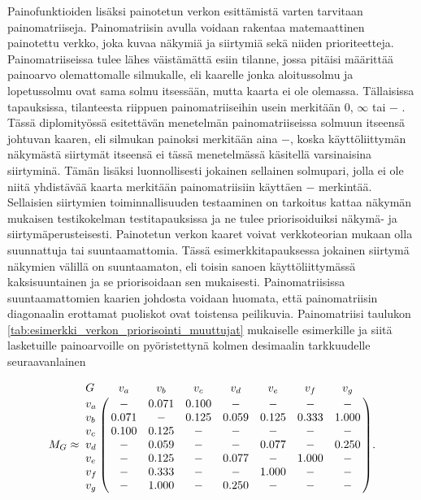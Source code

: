   Painofunktioiden lisäksi painotetun verkon esittämistä varten tarvitaan painomatriiseja.
  Painomatriisin avulla voidaan rakentaa matemaattinen painotettu verkko, joka kuvaa näkymiä ja siirtymiä sekä niiden prioriteetteja.
  Painomatriiseissa tulee lähes väistämättä esiin tilanne, jossa pitäisi määrittää painoarvo olemattomalle silmukalle, eli kaarelle jonka aloitussolmu ja lopetussolmu ovat sama solmu itsessään, mutta kaarta ei ole olemassa.
  Tällaisissa tapauksissa, tilanteesta riippuen painomatriiseihin usein merkitään \(0\), \(\infty\) tai \(-\) \parencite{graph_theory_concepts_1}.
  Tässä diplomityössä esitettävän menetelmän painomatriiseissa solmuun itseensä johtuvan kaaren, eli silmukan painoksi merkitään aina \(-\), koska käyttöliittymän näkymästä siirtymät itseensä ei tässä menetelmässä käsitellä varsinaisina siirtyminä.
  Tämän lisäksi luonnollisesti jokainen sellainen solmupari, jolla ei ole niitä yhdistävää kaarta merkitään painomatriisiin käyttäen \(-\) merkintää.
  Sellaisien siirtymien toiminnallisuuden testaaminen on tarkoitus kattaa näkymän mukaisen testikokelman testitapauksissa ja ne tulee priorisoiduiksi näkymä- ja siirtymäperusteisesti.
  Painotetun verkon kaaret voivat verkkoteorian mukaan olla suunnattuja tai suuntaamattomia.
  Tässä esimerkkitapauksessa jokainen siirtymä näkymien välillä on suuntaamaton, eli toisin sanoen käyttöliittymässä kaksisuuntainen ja se priorisoidaan sen mukaisesti.
  Painomatriisissa suuntaamattomien kaarien johdosta voidaan huomata, että painomatriisin diagonaalin erottamat puoliskot ovat toistensa peilikuvia.
  Painomatriisi taulukon \ref{tab:esimerkki_verkon_priorisointi_muuttujat} mukaiselle esimerkille ja siitä lasketuille painoarvoille on pyöristettynä kolmen desimaalin tarkkuudelle seuraavanlainen

  \begin{equation} \label{eq:5_5_2}
    M_G \approx
    \bordermatrix{
      G   & v_a   & v_b   & v_c   & v_d   & v_e   & v_f   & v_g   \cr
      v_a & -     & 0.071 & 0.100 & -     & -     & -     & -     \cr
      v_b & 0.071 & -     & 0.125 & 0.059 & 0.125 & 0.333 & 1.000 \cr
      v_c & 0.100 & 0.125 & -     & -     & -     & -     & -     \cr
      v_d & -     & 0.059 & -     & -     & 0.077 & -     & 0.250 \cr
      v_e & -     & 0.125 & -     & 0.077 & -     & 1.000 & -     \cr
      v_f & -     & 0.333 & -     & -     & 1.000 & -     & -     \cr
      v_g & -     & 1.000 & -     & 0.250 & -     & -     & -     \cr
    }
    \text{.}
  \end{equation}

